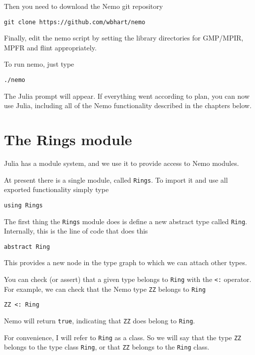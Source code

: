 \documentclass[a4paper,10pt]{article}
\newcommand{\code}{\lstinline}
\begin{document}
{Then you need to download the Nemo git repository

\begin{verbatim}
git clone https://github.com/wbhart/nemo
\end{verbatim}

Finally, edit the nemo script by setting the library directories for GMP/MPIR, MPFR
and flint appropriately.

To run nemo, just type

\begin{verbatim}
./nemo
\end{verbatim}

The Julia prompt will appear. If everything went according to plan, you can now use 
Julia, including all of the Nemo functionality described in the chapters below.

\section{The Rings module}

Julia has a module system, and we use it to provide access to Nemo modules.

At present there is a single module, called \code{Rings}. To import it and use all
exported functionality simply type

\begin{lstlisting}
using Rings
\end{lstlisting}

The first thing the \code{Rings} module does is define a new abstract type called
\code{Ring}. Internally, this is the line of code that does this

\begin{lstlisting}
abstract Ring
\end{lstlisting}

This provides a new node in the type graph to which we can attach other types. 

You can check (or assert) that a given type belongs to \code{Ring} with the
\code{<:} operator. For example, we can check that the Nemo type \code{ZZ} belongs
to \code{Ring}

\begin{lstlisting}
ZZ <: Ring
\end{lstlisting}

Nemo will return \code{true}, indicating that \code{ZZ} does belong to \code{Ring}.

For convenience, I will refer to \code{Ring} as a class. So we will say that the 
type \code{ZZ} belongs to the type class \code{Ring}, or that \code{ZZ} belongs to
the \code{Ring} class.

}
\end{document}
